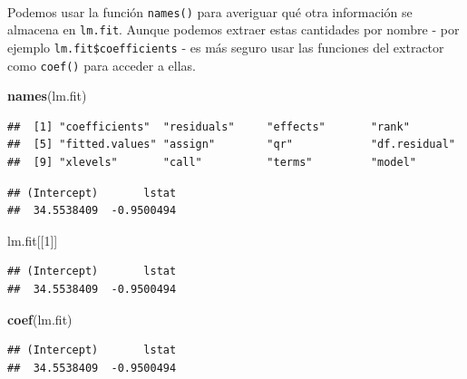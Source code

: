 \documentclass[]{book}
\newenvironment{Shaded}{\begin{snugshade}}{\end{snugshade}}
\newcommand{\KeywordTok}[1]{\textcolor[rgb]{0.13,0.29,0.53}{\textbf{#1}}}
\newcommand{\DecValTok}[1]{\textcolor[rgb]{0.00,0.00,0.81}{#1}}
\newcommand{\OperatorTok}[1]{\textcolor[rgb]{0.81,0.36,0.00}{\textbf{#1}}}
\newcommand{\NormalTok}[1]{#1}
\begin{document}
~

Podemos usar la función \texttt{names()} para averiguar qué otra
información se almacena en \texttt{lm.fit}. Aunque podemos extraer estas
cantidades por nombre - por ejemplo \texttt{lm.fit\$coefficients} - es
más seguro usar las funciones del extractor como \texttt{coef()} para
acceder a ellas.

\begin{Shaded}
\begin{Highlighting}[]
\KeywordTok{names}\NormalTok{(lm.fit)}
\end{Highlighting}
\end{Shaded}

\begin{verbatim}
##  [1] "coefficients"  "residuals"     "effects"       "rank"         
##  [5] "fitted.values" "assign"        "qr"            "df.residual"  
##  [9] "xlevels"       "call"          "terms"         "model"
\end{verbatim}

\begin{Shaded}
\end{Shaded}

\begin{verbatim}
## (Intercept)       lstat 
##  34.5538409  -0.9500494
\end{verbatim}

\begin{Shaded}
\begin{Highlighting}[]
\NormalTok{lm.fit[[}\DecValTok{1}\NormalTok{]]}
\end{Highlighting}
\end{Shaded}

\begin{verbatim}
## (Intercept)       lstat 
##  34.5538409  -0.9500494
\end{verbatim}

\begin{Shaded}
\begin{Highlighting}[]
\KeywordTok{coef}\NormalTok{(lm.fit)}
\end{Highlighting}
\end{Shaded}

\begin{verbatim}
## (Intercept)       lstat 
##  34.5538409  -0.9500494
\end{verbatim}
\end{document}
